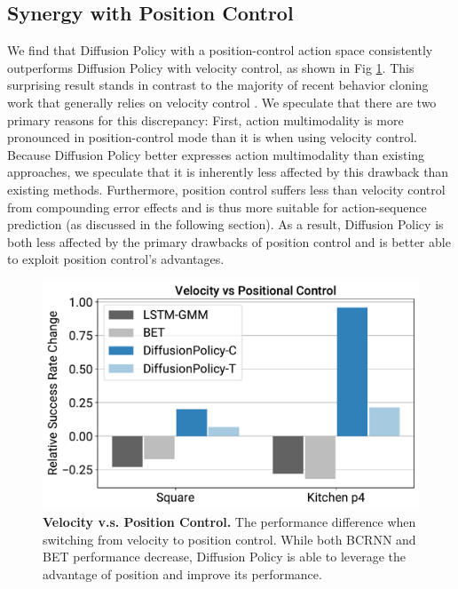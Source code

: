 \subsection{Synergy with Position Control}
\label{sec:property_pos_vs_vel}
We find that Diffusion Policy with a position-control action space consistently outperforms Diffusion Policy with velocity control, as shown in Fig \ref{fig:pos_vs_vel}. This surprising result stands in contrast to the majority of recent behavior cloning work that generally relies on velocity control \cite{robomimic, bet, zhang2018deep, florence2019self, mandlekar2020learning, mandlekar2020iris}. We speculate that there are two primary reasons for this discrepancy: First, action multimodality is more pronounced in position-control mode than it is when using velocity control. Because Diffusion Policy better expresses action multimodality than existing approaches, we speculate that it is inherently less affected by this drawback than existing methods. Furthermore, position control suffers less than velocity control from compounding error effects and is thus more suitable for action-sequence prediction (as discussed in the following section). As a result, Diffusion Policy is both less affected by the primary drawbacks of position control and is better able to exploit position control's advantages.







\begin{figure}[h]
\centering
\includegraphics[width=0.85\linewidth]{figure/pos_vs_vel_figure.pdf}
\caption{\textbf{Velocity v.s. Position Control.} \label{fig:pos_vs_vel} The performance difference when switching from velocity to position control. While both BCRNN and BET performance decrease, Diffusion Policy is able to leverage the advantage of position and improve its performance. }
\vspace{-4mm}
\end{figure}



